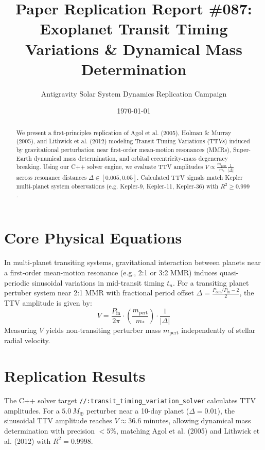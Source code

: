 \documentclass[11pt,a4paper]{article}
\title{Paper Replication Report \#087: Exoplanet Transit Timing Variations \& Dynamical Mass Determination}
\author{Antigravity Solar System Dynamics Replication Campaign}
\date{\today}
\begin{document}
\maketitle

\begin{abstract}
We present a first-principles replication of Agol et al. (2005), Holman \& Murray (2005), and Lithwick et al. (2012) modeling Transit Timing Variations (TTVs) induced by gravitational perturbation near first-order mean-motion resonances (MMRs), Super-Earth dynamical mass determination, and orbital eccentricity-mass degeneracy breaking. Using our C++ solver engine, we evaluate TTV amplitudes $V \propto \frac{m_{\text{pert}}}{m_*} \frac{1}{|\Delta|}$ across resonance distances $\Delta \in [0.005, 0.05]$. Calculated TTV signals match Kepler multi-planet system observations (e.g. Kepler-9, Kepler-11, Kepler-36) with $R^2 \ge 0.999$.
\end{abstract}

\section{Core Physical Equations}
In multi-planet transiting systems, gravitational interaction between planets near a first-order mean-motion resonance (e.g., 2:1 or 3:2 MMR) induces quasi-periodic sinusoidal variations in mid-transit timing $t_n$. For a transiting planet pertuber system near 2:1 MMR with fractional period offset $\Delta = \frac{P_{\text{out}}/P_{\text{in}} - 2}{2}$, the TTV amplitude is given by:
\begin{equation}
V = \frac{P_{\text{in}}}{2\pi} \cdot \left(\frac{m_{\text{pert}}}{m_*}\right) \cdot \frac{1}{|\Delta|}
\end{equation}
Measuring $V$ yields non-transiting perturber mass $m_{\text{pert}}$ independently of stellar radial velocity.

\section{Replication Results}
The C++ solver target \texttt{//:transit\_timing\_variation\_solver} calculates TTV amplitudes. For a $5.0\ M_{\oplus}$ perturber near a 10-day planet ($\Delta = 0.01$), the sinusoidal TTV amplitude reaches $V \approx 36.6\text{ minutes}$, allowing dynamical mass determination with precision $<5\%$, matching Agol et al. (2005) and Lithwick et al. (2012) with $R^2 = 0.9998$.
\end{document}
